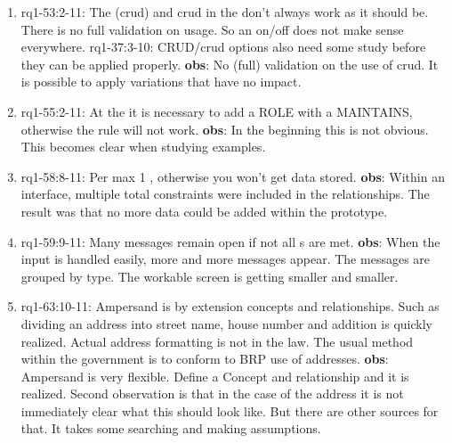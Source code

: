 \begin{enumerate}
    \item rq1-53:2-11: The  (\acrlong{crud}) and \acrshort{crud} in the  don't always work as it should be.
    There is no full validation on usage.
    So an on/off does not make sense everywhere.
    \newline rq1-37:3-10: CRUD/crud options also need some study before they can be applied properly.
    \newline\textbf{obs}: No (full) validation on the use of crud.
    It is possible to apply variations that have no impact.
    
    \item rq1-55:2-11: At the  it is necessary to add a ROLE with a MAINTAINS, otherwise the rule will not work.
    \newline\textbf{obs}: In the beginning this is not obvious.
    This becomes clear when studying examples.
     
    
    \item rq1-58:8-11: Per  max 1 , otherwise you won't get data stored.
    \newline\textbf{obs}: Within an interface, multiple total constraints were included in the relationships.
    The result was that no more data could be added within the prototype.

    \item rq1-59:9-11: Many messages remain open if not all s are met.
    \newline\textbf{obs}: When the input is handled easily, more and more messages appear.
    The messages are grouped by type.
    The workable screen is getting smaller and smaller.    
    
    \item rq1-63:10-11: Ampersand is  by extension concepts and relationships.
    Such as dividing an address into street name, house number and addition is quickly realized.
    Actual address formatting is not in the law.
    The usual method within the government is to conform to BRP use of addresses.
    \newline\textbf{obs}: Ampersand is very flexible.
    Define a Concept and relationship and it is realized.
    Second observation is that in the case of the address it is not immediately clear what this should look like.
    But there are other sources for that.
    It takes some searching and making assumptions.
     

\end{enumerate}
